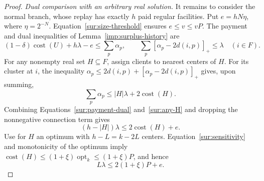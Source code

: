 \begin{proof}
\textit{Dual comparison with an arbitrary real solution.}
It remains to consider the normal branch, whose replay has exactly $h$
paid regular facilities.  Put $e=hN\eta$, where $\eta=2^{-N}$.
Equation~\eqref{sur:size-threshold} ensures $e\le v\le vP$.
The payment and dual inequalities of Lemma~\ref{imp:surplus-history}
are
\begin{equation}\label{sur:payment-dual}
 (1-\delta)\operatorname{cost}(U)+h\lambda-e
 \le\sum_p\alpha_p,
 \qquad \sum_p[\alpha_p-2d(i,p)]_+\le\lambda\quad(i\in F).
\end{equation}
For any nonempty real set $H\subseteq F$, assign clients to nearest
centers of $H$.  For its cluster at $i$, the inequality
$\alpha_p\le2d(i,p)+[\alpha_p-2d(i,p)]_+$ gives, upon summing,
\begin{equation}\label{sur:any-H}
 \sum_p\alpha_p\le |H|\lambda+2\operatorname{cost}(H).
\end{equation}
Combining Equations~\eqref{sur:payment-dual} and~\eqref{sur:any-H}
and dropping the nonnegative connection term gives
\begin{equation}\label{sur:price-comparison}
 (h-|H|)\lambda\le2\operatorname{cost}(H)+e.
\end{equation}
Use for $H$ an optimum with $h-L=k-2L$ centers.  Equation~\eqref{sur:sensitivity}
and monotonicity of the optimum imply
$\operatorname{cost}(H)\le(1+\xi)\operatorname{opt}_k\le(1+\xi)P$,
and hence
\begin{equation}\label{sur:surplus-price}
 L\lambda\le2(1+\xi)P+e.
\end{equation}


\end{proof}
